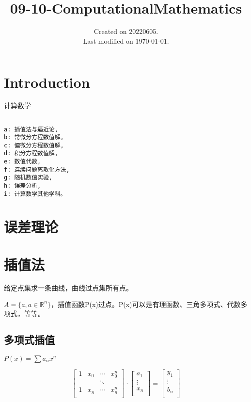 \documentclass[UTF8]{../09-Mathematics}
\begin{document}
\title{09-10-ComputationalMathematics}
\date{Created on 20220605.\\   Last modified on \today.}
\maketitle
\tableofcontents


\chapter{Introduction}
计算数学

\begin{lstlisting}
  
a: 插值法与逼近论, 
b: 常微分方程数值解, 
c: 偏微分方程数值解, 
d: 积分方程数值解, 
e: 数值代数, 
f: 连续问题离散化方法, 
g: 随机数值实验, 
h: 误差分析, 
i: 计算数学其他学科。

\end{lstlisting}



\chapter{误差理论}



\chapter{插值法}
给定点集求一条曲线，曲线过点集所有点。

$A = \{a, a\in \mathbb R^n\}$，插值函数P(x)过点。P(x)可以是有理函数、三角多项式、代数多项式，等等。

\section{多项式插值}
$P(x) = \sum a_n x^n$

\begin{equation}
    \begin{bmatrix}
       1 & x_0 & \cdots & x_0^n\\
       & & \ddots & \\
       1 & x_n & \cdots & x_n^n\\
    \end{bmatrix}
    \cdot
    \begin{bmatrix}
      a_1 \\
      \vdots \\
      x_n \\
    \end{bmatrix}
    =
    \begin{bmatrix}
      y_1 \\
      \vdots \\
      b_n \\
    \end{bmatrix}
\end{equation}
\end{document}
